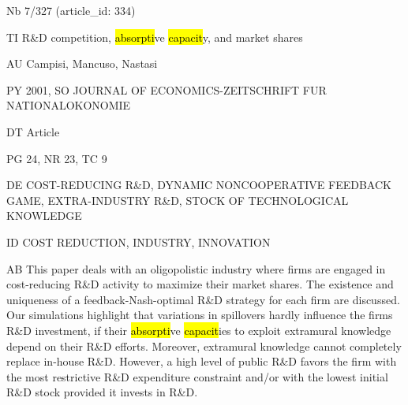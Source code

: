 \documentclass[a4paper]{article}
\begin{document}
\vspace*{-2cm}
Nb \tabto{0cm}7/327 (article\_id: 334)\par
TI \tabto{0cm}R\&D competition, \hl{absorpti}ve \hl{capacit}y, and market shares\par
AU \tabto{0cm}Campisi, Mancuso, Nastasi\par
PY \tabto{0cm}2001, SO JOURNAL OF ECONOMICS-ZEITSCHRIFT FUR NATIONALOKONOMIE\par
DT \tabto{0cm}Article\par
PG \tabto{0cm}24, NR 23, TC 9\par
DE \tabto{0cm}COST-REDUCING R\&D, DYNAMIC NONCOOPERATIVE FEEDBACK GAME, EXTRA-INDUSTRY R\&D, STOCK OF TECHNOLOGICAL KNOWLEDGE\par
ID \tabto{0cm}COST REDUCTION, INDUSTRY, INNOVATION\par
AB \tabto{0cm}This paper deals with an oligopolistic industry where firms are engaged in cost-reducing R\&D activity to maximize their market shares. The existence and uniqueness of a feedback-Nash-optimal R\&D strategy for each firm are discussed. Our simulations highlight that variations in spillovers hardly influence the firms R\&D investment, if their \hl{absorpti}ve \hl{capacit}ies to exploit extramural knowledge depend on their R\&D efforts. Moreover, extramural knowledge cannot completely replace in-house R\&D. However, a high level of public R\&D favors the firm with the most restrictive R\&D expenditure constraint and/or with the lowest initial R\&D stock provided it invests in R\&D.\par
\clearpage
\end{document}
